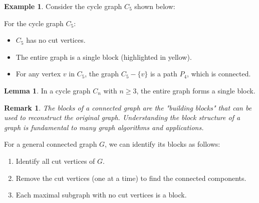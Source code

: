 \documentclass{article}
\newtheorem{remark}{Remark}
\theoremstyle{definition}
\newtheorem{example}{Example}
\newtheorem{lemma}{Lemma}
\begin{document}
\begin{example}
Consider the cycle graph $C_5$ shown below:

\begin{center}
\noindent\begin{minipage}{\linewidth}\centering
{}
\label{fig:c5-single-block}
\end{minipage}

For the cycle graph $C_5$:
\begin{itemize}
    \item $C_5$ has no cut vertices.
    \item The entire graph is a single block (highlighted in yellow).
    \item For any vertex $v$ in $C_5$, the graph $C_5 - \{v\}$ is a path $P_4$, which is connected.
\end{itemize}

\begin{lemma}
In a cycle graph $C_n$ with $n \geq 3$, the entire graph forms a single block.
\end{lemma}

\begin{remark}
The blocks of a connected graph are the "building blocks" that can be used to reconstruct the original graph. Understanding the block structure of a graph is fundamental to many graph algorithms and applications.
\end{remark}

For a general connected graph $G$, we can identify its blocks as follows:
\begin{enumerate}
    \item Identify all cut vertices of $G$.
    \item Remove the cut vertices (one at a time) to find the connected components.
    \item Each maximal subgraph with no cut vertices is a block.
\end{enumerate}
\end{center}
\end{example}
\pagebreak
\newpage
\end{document}
